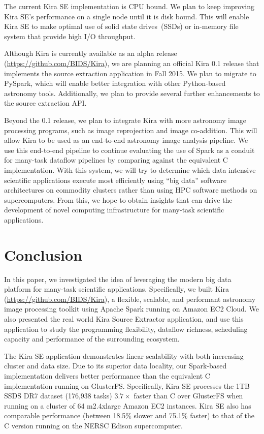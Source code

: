 \documentclass[conference]{IEEEtran}
\begin{document}
The current Kira SE implementation is CPU bound. We plan to keep improving Kira SE's performance
on a single node until it is disk bound. This will enable Kira SE to make optimal use of
solid state drives~(SSDs) or in-memory file system that provide high I/O throughput.

Although Kira is currently available as an alpha release (\url{https://github.com/BIDS/Kira}), we are planning an official Kira 0.1 release
that implements the source extraction application in Fall 2015.
We plan to migrate to PySpark, which will enable better integration with other
Python-based astronomy tools. Additionally, we plan to provide several further enhancements to
the source extraction API.

Beyond the 0.1 release, we plan to integrate Kira with more astronomy image processing
programs, such as image reprojection and image co-addition. This will allow Kira to be
used as an end-to-end astronomy image analysis pipeline. We use this end-to-end pipeline
to continue evaluating the use of Spark as a conduit for many-task dataflow pipelines by
comparing against the equivalent C implementation. With this system, we will try to determine
which data intensive scientific applications execute most efficiently using ``big data''
software architectures on commodity clusters rather than using HPC software methods on supercomputers.
From this, we hope to obtain insights that can drive the development of novel computing
infrastructure for many-task scientific applications.

\section{Conclusion}
\label{sec:Conclusion}

In this paper, we investigated the idea of leveraging the modern big data platform for many-task
scientific applications. Specifically, we built Kira (\url{https://github.com/BIDS/Kira}), a flexible, scalable,
and performant astronomy image processing toolkit using Apache Spark running on Amazon EC2 Cloud. We also presented
the real world Kira Source Extractor application, and use this application to study the programming
flexibility, dataflow richness, scheduling capacity and performance of the surrounding ecosystem.

The Kira SE application demonstrates linear scalability with both increasing cluster and data
size. Due to its superior data locality, our Spark-based implementation delivers better performance than the equivalent C 
implementation running on GlusterFS. Specifically, Kira SE processes the 1TB SSDS DR7 dataset (176,938 tasks)
$3.7\times$ faster than C over GlusterFS when running on a cluster of 64 m2.4xlarge Amazon
EC2 instances. Kira SE also has comparable performance (between 18.5\% slower and 75.1\% faster)
to that of the C version running on the NERSC Edison supercomputer.  
\end{document}
